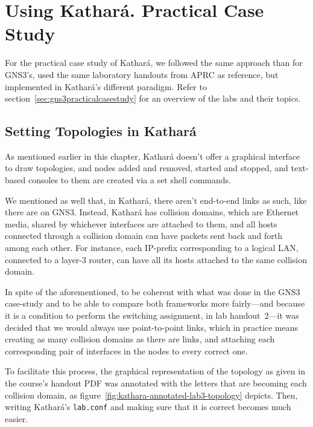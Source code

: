 \section{Using Kathará. Practical Case Study}
\label{sec:katharapracticalcasestudy}

For the practical case study of Kathará, we followed the same approach than for GNS3's, used the same laboratory handouts from APRC as reference, but implemented in Kathará's different paradigm.
Refer to section~\ref{sec:gns3practicalcasestudy} for an overview of the labs and their topics.

\subsection{Setting Topologies in Kathará}

As mentioned earlier in this chapter, Kathará doesn't offer a graphical interface to draw topologies, and nodes added and removed, started and stopped, and text-based consoles to them are created via a set shell commands.

We mentioned as well that, in Kathará, there aren't end-to-end links as such, like there are on GNS3.
Instead, Kathará has collision domains, which are Ethernet media, shared by whichever interfaces are attached to them, and all hosts connected through a collision domain can have packets sent back and forth among each other.
For instance, each IP-prefix corresponding to a logical LAN, connected to a layer-3 router, can have all its hosts attached to the same collision domain.

In spite of the aforementioned, to be coherent with what was done in the GNS3 case-study and to be able to compare both frameworks more fairly---and because it is a condition to perform the switching assignment, in lab handout~2---it was decided that we would always use point-to-point links, which in practice means creating as many collision domains as there are links, and attaching each corresponding pair of interfaces in the nodes to every correct one. %



To facilitate this process, the graphical representation of the topology as given in the course's handout PDF was annotated with the letters that are becoming each collision domain, as figure~\ref{fig:kathara-annotated-lab3-topology} depicts. %
Then, writing Kathará's \texttt{lab.conf} and making sure that it is correct becomes much easier.


